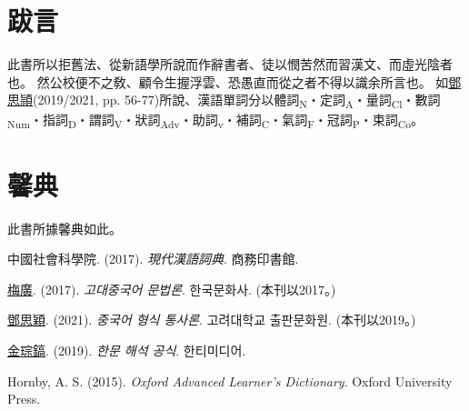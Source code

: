 \chapter*{跋言}
此書所以拒舊法、從新語學所說而作辭書者、徒以憫苦然而習漢文、而虛光陰者也。
然公校便不之敎、顧令生握浮雲、恐愚直而從之者不得以識余所言也。
如\underline{鄧思頴}(2019/2021, pp. 56-77)所說、漢語單詞分以體詞\textsubscript{N}・定詞\textsubscript{A}・量詞\textsubscript{Cl}・數詞\textsubscript{Num}・指詞\textsubscript{D}・謂詞\textsubscript{V}・狀詞\textsubscript{Adv}・助詞\textsubscript{v}・補詞\textsubscript{C}・氣詞\textsubscript{F}・冠詞\textsubscript{P}・束詞\textsubscript{Co}。
\chapter*{馨典}
此書所據馨典如此。
\par 中國社會科學院. (2017). \textit{現代漢語詞典}. 商務印書館.
\par \underline{梅廣}. (2017). \textit{고대중국어 문법론}. 한국문화사. (本刊以2017。)
\par \underline{鄧思穎}. (2021). \textit{중국어 형식 통사론}. 고려대학교 출판문화원. (本刊以2019。)
\par \underline{金琮鎬}. (2019). \textit{한문 해석 공식}. 한티미디어.
\par Hornby, A. S. (2015). \textit{Oxford Advanced Learner's Dictionary}. Oxford University Press.
